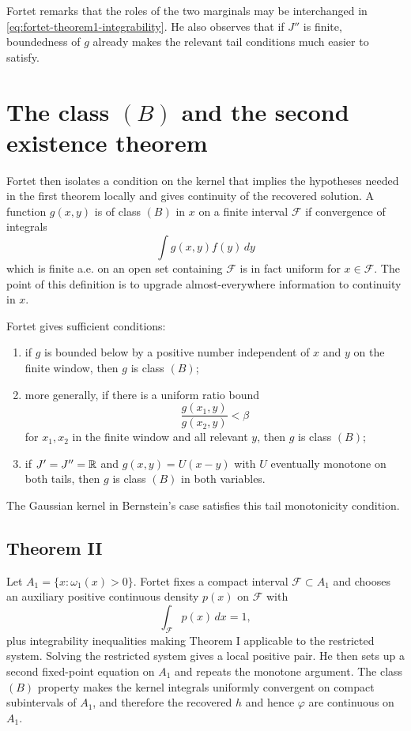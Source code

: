 Fortet remarks that the roles of the two marginals may be interchanged in
\eqref{eq:fortet-theorem1-integrability}.  He also observes that if $J''$ is
finite, boundedness of $g$ already makes the relevant tail conditions much
easier to satisfy.

\section{The class $(B)$ and the second existence theorem}
Fortet then isolates a condition on the kernel that implies the hypotheses needed in the first theorem locally and gives continuity of the recovered solution.
A function $g(x,y)$ is of class $(B)$ in $x$ on a finite interval $\mathcal F$ if convergence of integrals
\[
  \int g(x,y)f(y)\,dy
\]
which is finite a.e. on an open set containing $\mathcal F$ is in fact uniform for $x\in\mathcal F$.  The point of this definition is to upgrade almost-everywhere information to continuity in $x$.

Fortet gives sufficient conditions:
\begin{enumerate}[leftmargin=2em]
\item if $g$ is bounded below by a positive number independent of $x$ and $y$ on the finite window, then $g$ is class $(B)$;
\item more generally, if there is a uniform ratio bound
\[
  \frac{g(x_1,y)}{g(x_2,y)}<\beta
\]
for $x_1,x_2$ in the finite window and all relevant $y$, then $g$ is class $(B)$;
\item if $J'=J''=\mathbb{R}$ and $g(x,y)=U(x-y)$ with $U$ eventually monotone on both tails, then $g$ is class $(B)$ in both variables.
\end{enumerate}
The Gaussian kernel in Bernstein's case satisfies this tail monotonicity condition.

\subsection{Theorem II}
Let $A_1=\{x:\omega_1(x)>0\}$.  Fortet fixes a compact interval $\mathcal F\subset A_1$ and chooses an auxiliary positive continuous density $p(x)$ on $\mathcal F$ with
\[
  \int_{\mathcal F}p(x)\,dx=1,
\]
plus integrability inequalities making Theorem I applicable to the restricted system.  Solving the restricted system gives a local positive pair.  He then sets up a second fixed-point equation on $A_1$ and repeats the monotone argument.  The class $(B)$ property makes the kernel integrals uniformly convergent on compact subintervals of $A_1$, and therefore the recovered $h$ and hence $\varphi$ are continuous on $A_1$.

